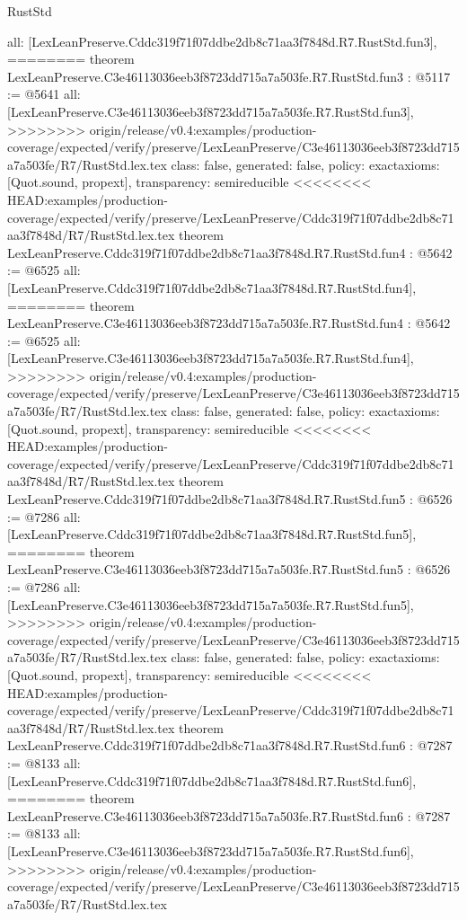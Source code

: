 \begin{lexlean}{RustStd}
\begin{coremodule}
{\begin{coremodule}
{{{{{{  all: [LexLeanPreserve.Cddc319f71f07ddbe2db8c71aa3f7848d.R7.RustStd.fun3],
========
theorem LexLeanPreserve.C3e46113036eeb3f8723dd715a7a503fe.R7.RustStd.fun3 : @5117 := @5641 {
  all: [LexLeanPreserve.C3e46113036eeb3f8723dd715a7a503fe.R7.RustStd.fun3],
>>>>>>>> origin/release/v0.4:examples/production-coverage/expected/verify/preserve/LexLeanPreserve/C3e46113036eeb3f8723dd715a7a503fe/R7/RustStd.lex.tex
  class: false,
  generated: false,
  policy: exact{axioms: [Quot.sound, propext]},
  transparency: semireducible
}
<<<<<<<< HEAD:examples/production-coverage/expected/verify/preserve/LexLeanPreserve/Cddc319f71f07ddbe2db8c71aa3f7848d/R7/RustStd.lex.tex
theorem LexLeanPreserve.Cddc319f71f07ddbe2db8c71aa3f7848d.R7.RustStd.fun4 : @5642 := @6525 {
  all: [LexLeanPreserve.Cddc319f71f07ddbe2db8c71aa3f7848d.R7.RustStd.fun4],
========
theorem LexLeanPreserve.C3e46113036eeb3f8723dd715a7a503fe.R7.RustStd.fun4 : @5642 := @6525 {
  all: [LexLeanPreserve.C3e46113036eeb3f8723dd715a7a503fe.R7.RustStd.fun4],
>>>>>>>> origin/release/v0.4:examples/production-coverage/expected/verify/preserve/LexLeanPreserve/C3e46113036eeb3f8723dd715a7a503fe/R7/RustStd.lex.tex
  class: false,
  generated: false,
  policy: exact{axioms: [Quot.sound, propext]},
  transparency: semireducible
}
<<<<<<<< HEAD:examples/production-coverage/expected/verify/preserve/LexLeanPreserve/Cddc319f71f07ddbe2db8c71aa3f7848d/R7/RustStd.lex.tex
theorem LexLeanPreserve.Cddc319f71f07ddbe2db8c71aa3f7848d.R7.RustStd.fun5 : @6526 := @7286 {
  all: [LexLeanPreserve.Cddc319f71f07ddbe2db8c71aa3f7848d.R7.RustStd.fun5],
========
theorem LexLeanPreserve.C3e46113036eeb3f8723dd715a7a503fe.R7.RustStd.fun5 : @6526 := @7286 {
  all: [LexLeanPreserve.C3e46113036eeb3f8723dd715a7a503fe.R7.RustStd.fun5],
>>>>>>>> origin/release/v0.4:examples/production-coverage/expected/verify/preserve/LexLeanPreserve/C3e46113036eeb3f8723dd715a7a503fe/R7/RustStd.lex.tex
  class: false,
  generated: false,
  policy: exact{axioms: [Quot.sound, propext]},
  transparency: semireducible
}
<<<<<<<< HEAD:examples/production-coverage/expected/verify/preserve/LexLeanPreserve/Cddc319f71f07ddbe2db8c71aa3f7848d/R7/RustStd.lex.tex
theorem LexLeanPreserve.Cddc319f71f07ddbe2db8c71aa3f7848d.R7.RustStd.fun6 : @7287 := @8133 {
  all: [LexLeanPreserve.Cddc319f71f07ddbe2db8c71aa3f7848d.R7.RustStd.fun6],
========
theorem LexLeanPreserve.C3e46113036eeb3f8723dd715a7a503fe.R7.RustStd.fun6 : @7287 := @8133 {
  all: [LexLeanPreserve.C3e46113036eeb3f8723dd715a7a503fe.R7.RustStd.fun6],
>>>>>>>> origin/release/v0.4:examples/production-coverage/expected/verify/preserve/LexLeanPreserve/C3e46113036eeb3f8723dd715a7a503fe/R7/RustStd.lex.tex
}}}}}}}}}}
\end{coremodule}}
\end{coremodule}
\end{lexlean}
